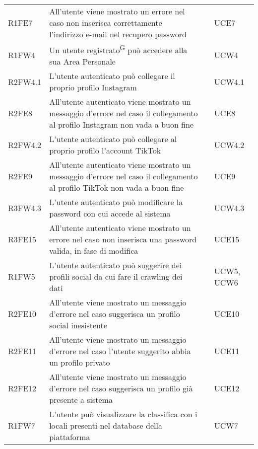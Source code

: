 \begin{longtable}{ m{}<{\centering}  m{}<{\centering}  m{}<{\centering}  m{}<{\centering}}
	R1FE7 & All’utente viene mostrato un errore nel caso non inserisca correttamente l’indirizzo e-mail nel recupero password & \Ob & UCE7\\	

	R1FW4 &	Un utente registrato\textsuperscript{G} può accedere alla sua Area Personale & \Ob & UCW4 \\ 
	 
	R2FW4.1 & L’utente autenticato può collegare il proprio profilo Instagram  & \Ob & UCW4.1\\	
	 
	R2FE8 & All’utente autenticato viene mostrato un messaggio d’errore nel caso il collegamento al profilo Instagram non vada a buon fine & \Ob & UCE8\\	
	 
	R2FW4.2 & L’utente autenticato può collegare al proprio profilo l’account TikTok & \Ob & UCW4.2\\		 

	R2FE9 & All’utente autenticato viene mostrato un messaggio d’errore nel caso il collegamento al profilo TikTok non vada a buon fine  & \Ob & UCE9 \\		
	 
	R3FW4.3 & L’utente autenticato può modificare la password con cui accede al sistema & \Fa & UCW4.3\\				
	 
	R3FE15 & All’utente autenticato viene mostrato un errore nel caso non inserisca una password valida, in fase di modifica  & \Fa & UCE15\\			
	  	 	 	
	R1FW5 & L’utente autenticato può suggerire dei profili social da cui fare il crawling dei dati & \Ob & UCW5, UCW6\\		
	 
	R2FE10 & All’utente viene mostrato un messaggio d’errore nel caso suggerisca un profilo social inesistente & \De & UCE10\\		

	R2FE11 & All’utente viene mostrato un messaggio d’errore nel caso l’utente suggerito abbia un profilo privato & \De & UCE11\\
	 
	R2FE12 & All’utente viene mostrato un messaggio d’errore nel caso suggerisca un profilo già presente a sistema & \De & UCE12\\			
	 
	R1FW7 & L’utente può visualizzare la classifica con i locali presenti nel database della piattaforma & \Ob & UCW7\\	
	 

\end{longtable}
